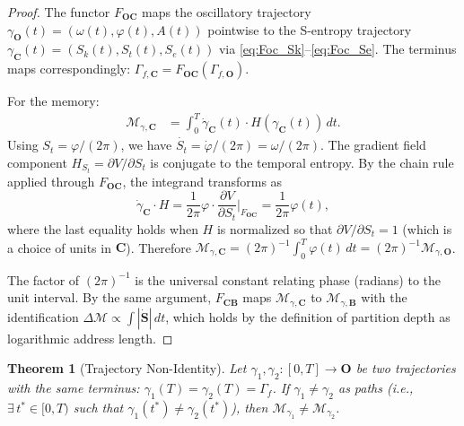 \documentclass[twocolumn,10pt]{article}
\newtheorem{theorem}{Theorem}[section]
\theoremstyle{remark}
\newcommand{\Depth}{\mathcal{M}}
\newcommand{\Sk}{S_k}
\newcommand{\St}{S_t}
\newcommand{\Se}{S_e}
\newcommand{\Scoord}{\mathbf{S}}
\newcommand{\CatO}{\mathbf{O}}
\newcommand{\CatC}{\mathbf{C}}
\newcommand{\CatB}{\mathbf{B}}
\newcommand{\Foc}{F_{\CatO\CatC}}
\newcommand{\Fcb}{F_{\CatC\CatB}}
\begin{document}
\begin{proof}
The functor $\Foc$ maps the oscillatory trajectory $\gamma_\CatO(t) = (\omega(t),\varphi(t),A(t))$ pointwise to the S-entropy trajectory $\gamma_\CatC(t) = (\Sk(t),\St(t),\Se(t))$ via \eqref{eq:Foc_Sk}--\eqref{eq:Foc_Se}.
The terminus maps correspondingly: $\Gamma_{f,\CatC} = \Foc(\Gamma_{f,\CatO})$.

For the memory:
\begin{align}
\mathcal{M}_{\gamma,\CatC} &= \int_0^T \dot{\gamma}_\CatC(t) \cdot H(\gamma_\CatC(t))\,dt.
\end{align}
Using $\St = \varphi/(2\pi)$, we have $\dot{\St} = \dot{\varphi}/(2\pi) = \omega/(2\pi)$.
The gradient field component $H_{\St} = \partial V/\partial \St$ is conjugate to the temporal entropy.
By the chain rule applied through $\Foc$, the integrand transforms as
\begin{equation}
\dot{\gamma}_\CatC \cdot H = \frac{1}{2\pi}\varphi \cdot \frac{\partial V}{\partial \St}\bigg|_{\Foc} = \frac{1}{2\pi}\varphi(t),
\end{equation}
where the last equality holds when $H$ is normalized so that $\partial V/\partial \St = 1$ (which is a choice of units in $\CatC$).
Therefore $\mathcal{M}_{\gamma,\CatC} = (2\pi)^{-1}\int_0^T \varphi(t)\,dt = (2\pi)^{-1}\mathcal{M}_{\gamma,\CatO}$.

The factor of $(2\pi)^{-1}$ is the universal constant relating phase (radians) to the unit interval.
By the same argument, $\Fcb$ maps $\mathcal{M}_{\gamma,\CatC}$ to $\mathcal{M}_{\gamma,\CatB}$ with the identification $\Delta\Depth \propto \int |\dot{\Scoord}|\,dt$, which holds by the definition of partition depth as logarithmic address length.
\end{proof}

\begin{theorem}[Trajectory Non-Identity]
\label{thm:traj_nonidentity}
Let $\gamma_1, \gamma_2: [0,T] \to \CatO$ be two trajectories with the same terminus: $\gamma_1(T) = \gamma_2(T) = \Gamma_f$.
If $\gamma_1 \neq \gamma_2$ as paths (i.e., $\exists\, t^* \in [0,T)$ such that $\gamma_1(t^*) \neq \gamma_2(t^*)$), then $\mathcal{M}_{\gamma_1} \neq \mathcal{M}_{\gamma_2}$.
\end{theorem}
\end{document}
